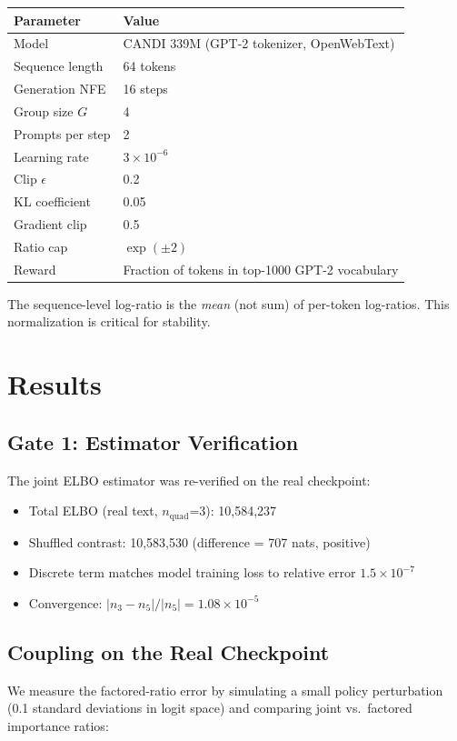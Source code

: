 \documentclass{article}
\begin{document}
\begin{tabular}{ll}
\toprule
Parameter & Value \\
\midrule
Model & CANDI 339M (GPT-2 tokenizer, OpenWebText) \\
Sequence length & 64 tokens \\
Generation NFE & 16 steps \\
Group size $G$ & 4 \\
Prompts per step & 2 \\
Learning rate & $3\times10^{-6}$ \\
Clip $\epsilon$ & 0.2 \\
KL coefficient & 0.05 \\
Gradient clip & 0.5 \\
Ratio cap & $\exp(\pm2)$ \\
Reward & Fraction of tokens in top-1000 GPT-2 vocabulary \\
\bottomrule
\end{tabular}

The sequence-level log-ratio is the \textit{mean} (not sum) of per-token log-ratios. This normalization is critical for stability.

\section{Results}

\subsection{Gate 1: Estimator Verification}

The joint ELBO estimator was re-verified on the real checkpoint:
\begin{itemize}
\item Total ELBO (real text, $n_\text{quad}$=3): 10,584,237
\item Shuffled contrast: 10,583,530 (difference = 707 nats, positive)
\item Discrete term matches model training loss to relative error $1.5\times10^{-7}$
\item Convergence: $|n_3 - n_5|/|n_5| = 1.08\times10^{-5}$
\end{itemize}

\subsection{Coupling on the Real Checkpoint}

We measure the factored-ratio error by simulating a small policy perturbation (0.1 standard deviations in logit space) and comparing joint vs.\ factored importance ratios:
\end{document}
